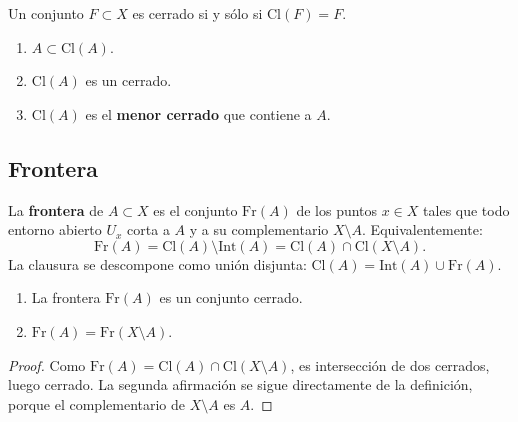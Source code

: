 \begin{proposición}
    Un conjunto $F \subset X$ es cerrado si y sólo si $\mathrm{Cl}(F) = F$.
\end{proposición}

\begin{proposición}
    \begin{enumerate}
        \item $A \subset \mathrm{Cl}(A)$.
        \item $\mathrm{Cl}(A)$ es un cerrado.
        \item $\mathrm{Cl}(A)$ es el \textbf{menor cerrado} que contiene a $A$.
    \end{enumerate}
\end{proposición}

\subsection{Frontera}

\begin{definición}[Frontera]
    La \textbf{frontera} de $A \subset X$ es el conjunto $\mathrm{Fr}(A)$ de los puntos $x \in X$ tales que todo entorno abierto $U_x$ corta a $A$ y a su complementario $X \setminus A$. Equivalentemente:
    $$\mathrm{Fr}(A) = \mathrm{Cl}(A) \setminus \mathrm{Int}(A) = \mathrm{Cl}(A) \cap \mathrm{Cl}(X \setminus A).$$
    La clausura se descompone como unión disjunta: $\mathrm{Cl}(A) = \mathrm{Int}(A) \cup \mathrm{Fr}(A)$.
\end{definición}

\begin{proposición}
    \begin{enumerate}
        \item La frontera $\mathrm{Fr}(A)$ es un conjunto cerrado.
        \item $\mathrm{Fr}(A) = \mathrm{Fr}(X \setminus A)$.
    \end{enumerate}
\end{proposición}
\begin{proof}
    Como $\mathrm{Fr}(A) = \mathrm{Cl}(A) \cap \mathrm{Cl}(X \setminus A)$, es intersección de dos cerrados, luego cerrado. La segunda afirmación se sigue directamente de la definición, porque el complementario de $X \setminus A$ es $A$.
\end{proof}

